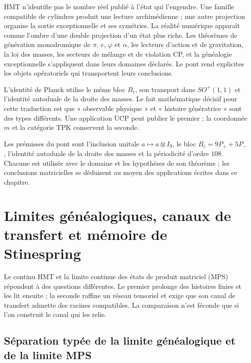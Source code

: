 HMT n'identifie pas le nombre réel publié à l'état qui l'engendre. Une
famille compatible de cylindres produit une lecture archimédienne ; une autre
projection organise la sortie exceptionnelle et ses symétries. La réalité
numérique apparaît comme l'ombre d'une double projection d'un état plus riche.
Les théorèmes de génération monodromique de $\pi$, $e$, $\varphi$ et $\alpha$,
les lecteurs d'action et de
gravitation, la loi des masses, les secteurs de mélange et de violation CP, et la
généalogie exceptionnelle s'appliquent dans leurs domaines déclarés. Le pont rend
explicites les objets opératoriels qui transportent leurs conclusions.

L'identité de Planck utilise le même bloc $B_c$, son
transport dans $SO^+(1,1)$ et l'identité autoduale de la droite des masses. Le
fait mathématique décisif pour cette traduction est que « observable physique » et
« histoire génératrice » sont des types différents. Une application UCP peut publier
le premier ; la coordonnée $m$ et la catégorie TPK conservent la seconde.

\begin{sourcebox}
Les prémisses du pont sont l'inclusion unitale
$a\mapsto a\otimes I_9$, le bloc $B_c=9P_++5P_-$, l'identité autoduale de
la droite des masses et la périodicité d'ordre \(108\). Chacune est utilisée avec
le domaine et les hypothèses de son théorème ; les conclusions matricielles se
déduisent au moyen des applications écrites dans ce chapitre.
\end{sourcebox}


\ifdefined\HMTGMCContinuumMPS
\section{Limites généalogiques, canaux de transfert et mémoire de Stinespring}
\label{p12-83-c22-s7:gmc:chap:continuo-mps}

Le continu HMT et la limite continue des états de produit matriciel (MPS)
répondent à des questions différentes. Le premier prolonge des histoires finies et
les lit ensuite ; la seconde raffine un réseau tensoriel et exige que son canal de
transfert admette des racines compatibles. La comparaison n'est féconde que si l'on
construit le canal qui les relie.

\subsection{Séparation typée de la limite généalogique et de la limite MPS}

